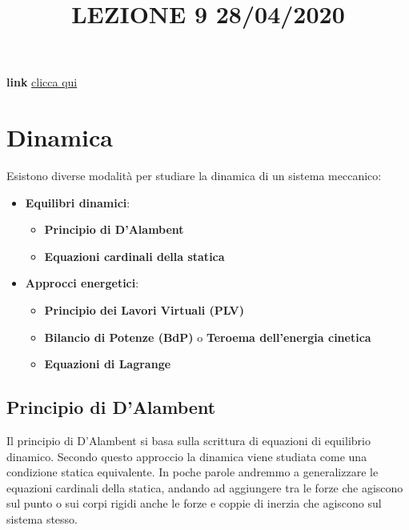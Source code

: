 \title{LEZIONE 9 28/04/2020}\newline
\textbf{link} \href{https://web.microsoftstream.com/video/673607e9-751d-488b-bb1d-79ee783a9b29}{clicca qui}
\section{Dinamica}
Esistono diverse modalità per studiare la dinamica di un sistema meccanico:
\begin{itemize}
    \item \textbf{Equilibri dinamici}:
    \begin{itemize}
        \item \textbf{Principio di D'Alambent}
        \item \textbf{Equazioni cardinali della statica}
    \end{itemize}
    \item \textbf{Approcci energetici}:
    \begin{itemize}
        \item \textbf{Principio dei Lavori Virtuali (PLV)}
        \item \textbf{Bilancio di Potenze (BdP)} o \textbf{Teroema dell'energia cinetica}
        \item \textbf{Equazioni di Lagrange}
    \end{itemize}
\end{itemize}
\subsection{Principio di D'Alambent}
Il principio di D'Alambent si basa sulla scrittura di equazioni di equilibrio dinamico.\newline
\newline
Secondo questo approccio la dinamica viene studiata come una condizione statica equivalente. In poche parole andremmo a generalizzare le equazioni cardinali della statica, andando ad aggiungere tra le forze che agiscono sul punto o sui corpi rigidi anche le forze e coppie di inerzia che agiscono sul sistema stesso.\newline
\newline
